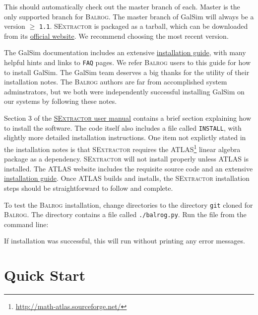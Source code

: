 \documentclass[12pt]{book}
\newcommand{\codett}[1]{\lstinline{#1}}
\newcommand{\galsim}{GalSim}
\newcommand{\balrog}{\textsc{Balrog}}
\newcommand{\sex}{\textsc{SExtractor}}
\begin{document}
\noindent This should automatically check out the master branch of each.
Master is the only supported branch for \balrog{}. 
The master branch of \galsim{} will always be a version $\geq$ \codett{1.1}.
\sex{} is packaged as a tarball, which can be downloaded 
from its \href{https://www.astromatic.net/software/sextractor}{official website}.
We recommend choosing the most recent version.

The \galsim{} documentation includes an extensive
\href{https://github.com/GalSim-developers/GalSim/blob/releases/1.0/INSTALL.md}{installation guide},
with many helpful hints and links to \codett{FAQ} pages. 
We refer \balrog{} users to this guide for how to install \galsim{}.
The \galsim{} team deserves a big thanks for the utility of their installation notes.
The \balrog{} authors are far from accomplished system adminstrators, 
but we both were independently successful installing \galsim{} on our systems by following these notes.

Section 3 of the \href{https://www.astromatic.net/pubsvn/software/sextractor/trunk/doc/sextractor.pdf}{\sex{} user manual}
contains a brief section explaining how to install the software. The code itself also includes a file called \codett{INSTALL}, with
slightly more detailed installation instructions.
One item not explictly stated in the installation notes is that \sex{} requires the ATLAS\footnote{\url{http://math-atlas.sourceforge.net/}}
linear algebra package as a dependency.
\sex{} will not install properly unless ATLAS is installed. 
The ATLAS website includes the requisite source code and
an extensive \href{http://math-atlas.sourceforge.net/atlas_install/}{installation guide}.
Once ATLAS builds and installs, the \sex{} installation steps should be straightforward to follow and complete.

To test the \balrog{} installation, change directories to the directory \codett{git} cloned for \balrog{}.
The directory contains a file called \codett{./balrog.py}. Run the file from the command line:

\begin{cmdline}
\end{cmdline}

\noindent If installation was successful, this will run without printing any error messages.

\chapter{Quick Start}
\label{sec:quick}
\end{document}
